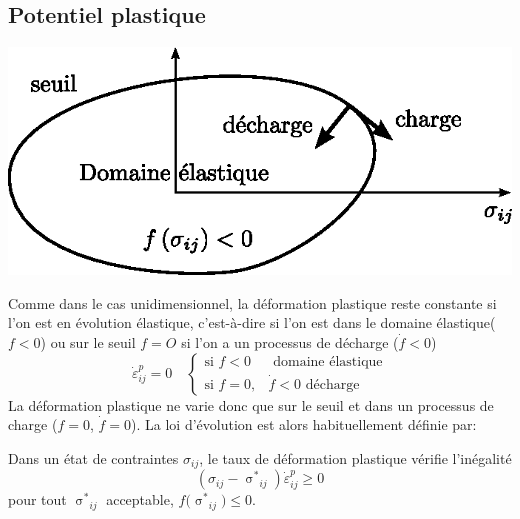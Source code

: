 \subsection{Potentiel plastique} \label{ssec:Ch10-1.3}
\begin{center}
    \includegraphics{../images/T1_Ch10-08}
\end{center}
Comme dans le cas unidimensionnel, la déformation plastique reste constante si l'on est en évolution élastique, c'est-à-dire si l'on est dans le domaine élastique($f<0$) ou sur le seuil $f=O$ si l'on a un processus de décharge ($\dot{f} < 0$) 
\begin{equation}
    \dot{\varepsilon}_{ij}^p = 0\quad
    \begin{cases}
        \text{si } f < 0 & \text{ domaine élastique} \\
        \text{si } f = 0, & \dot{f}<0 \text{ décharge}
    \end{cases}
    \label{eq:Ch10-019}
\end{equation}
La déformation plastique ne varie donc que sur le seuil et dans un processus de charge ($f=0$, $\dot{f}=0$).
La loi d'évolution est alors habituellement définie par: 
\begin{Principe}
    Dans un état de contraintes $\sigma_{ij}$, le taux de 
déformation plastique vérifie l'inégalité 
    \begin{equation}
        \left( \sigma_{ij} - {\mathop{\sigma}^{\ast}}_{ij} \right) \dot{\varepsilon}_{ij}^p \geq 0
        \label{eq:Ch10-020}
    \end{equation}
    pour tout $\displaystyle {\mathop{\sigma}^{\ast}}_{ij}$ acceptable, $\displaystyle f\bigl( {\mathop{\sigma}^{\ast}}_{ij} \bigr) \leq 0$.
\end{Principe}

